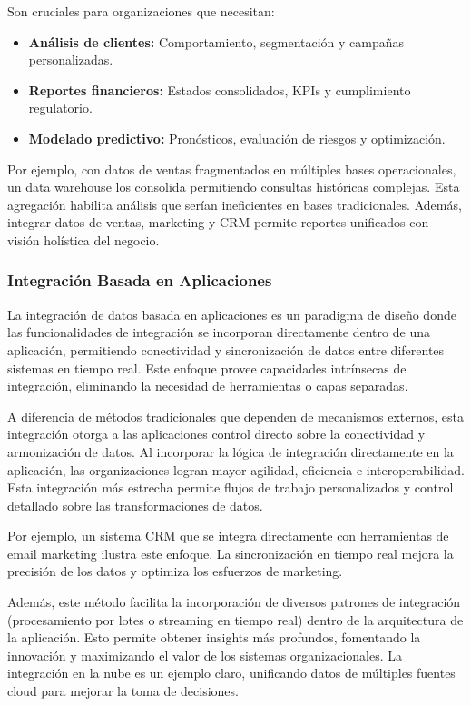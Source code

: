 \documentclass[12pt]{book}
\begin{document}
Son cruciales para organizaciones que necesitan:

\begin{itemize}
    \item \textbf{Análisis de clientes:} Comportamiento, segmentación y campañas personalizadas.
    \item \textbf{Reportes financieros:} Estados consolidados, KPIs y cumplimiento regulatorio.
    \item \textbf{Modelado predictivo:} Pronósticos, evaluación de riesgos y optimización.
\end{itemize}

Por ejemplo, con datos de ventas fragmentados en múltiples bases operacionales, un data warehouse los consolida permitiendo consultas históricas complejas. Esta agregación habilita análisis que serían ineficientes en bases tradicionales. Además, integrar datos de ventas, marketing y CRM permite reportes unificados con visión holística del negocio.

\subsubsection{Integración Basada en Aplicaciones}

La integración de datos basada en aplicaciones es un paradigma de diseño donde las funcionalidades de integración se incorporan directamente dentro de una aplicación, permitiendo conectividad y sincronización de datos entre diferentes sistemas en tiempo real. Este enfoque provee capacidades intrínsecas de integración, eliminando la necesidad de herramientas o capas separadas.

A diferencia de métodos tradicionales que dependen de mecanismos externos, esta integración otorga a las aplicaciones control directo sobre la conectividad y armonización de datos. Al incorporar la lógica de integración directamente en la aplicación, las organizaciones logran mayor agilidad, eficiencia e interoperabilidad. Esta integración más estrecha permite flujos de trabajo personalizados y control detallado sobre las transformaciones de datos.

Por ejemplo, un sistema CRM que se integra directamente con herramientas de email marketing ilustra este enfoque. La sincronización en tiempo real mejora la precisión de los datos y optimiza los esfuerzos de marketing.

Además, este método facilita la incorporación de diversos patrones de integración (procesamiento por lotes o streaming en tiempo real) dentro de la arquitectura de la aplicación. Esto permite obtener insights más profundos, fomentando la innovación y maximizando el valor de los sistemas organizacionales. La integración en la nube es un ejemplo claro, unificando datos de múltiples fuentes cloud para mejorar la toma de decisiones.
\end{document}
